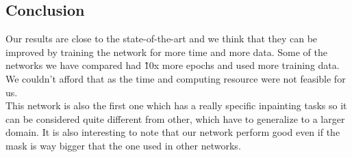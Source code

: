\documentclass[10pt,twocolumn,letterpaper]{article}
\begin{document}
\subsection{Conclusion}
Our results are close to the state-of-the-art and we think that they can be
improved by training the network for more time and more data. Some of the
networks we have compared had \~10x more epochs and used more training data. We
couldn't afford that as the time and computing resource were not feasible for
us.\\ This network is also the first one which has a really specific inpainting
tasks so it can be considered quite different from other, which have to
generalize to a larger domain. It is also interesting to note that our network
perform good even if the mask is way bigger that the one used in other networks.


{\small


}
\end{document}
